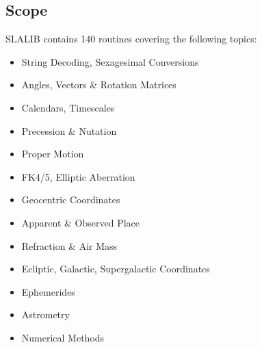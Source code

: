 \subsection{Scope}
SLALIB contains 140 routines covering the following topics:
\begin{itemize}
\item String Decoding,
      Sexagesimal Conversions
\item Angles, Vectors \& Rotation Matrices
\item Calendars,
      Timescales
\item Precession \& Nutation
\item Proper Motion
\item FK4/5,
      Elliptic Aberration
\item Geocentric Coordinates
\item Apparent \& Observed Place
\item Refraction \& Air Mass
\item Ecliptic,
      Galactic,
      Supergalactic Coordinates
\item Ephemerides
\item Astrometry
\item Numerical Methods
\end{itemize}

